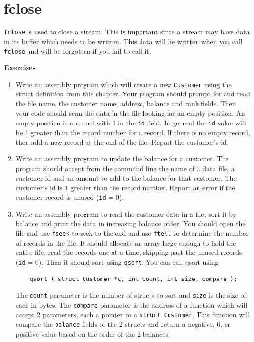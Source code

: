 \documentclass[11pt,b5paper]{book}
\begin{document}
\section{fclose}

{\tt fclose} is used to close a stream.
This is important since a stream may have data in its buffer which needs to be written.
This data will be written when you call {\tt fclose} and will be forgotten if you fail
to call it.

\vfill
\break
{\bf\large Exercises}

\begin{enumerate}
    \item Write an assembly program which will create a new {\tt Customer} using the struct definition from
    this chapter.
    Your program should prompt for and read the file name, the customer name, address, balance and rank fields.
    Then your code should scan the data in the file looking for an empty position.
    An empty position is a record with 0 in the {\tt id} field.
    In general the {\tt id} value will be 1 greater than the record number for a record.
    If there is no empty record, then add a new record at the end of the file.
    Report the customer's id.
    
    \item Write an assembly program to update the balance for a customer.
    The program should accept from the command line the name of a data file, a customer id and
    an amount to add to the balance for that customer.
    The customer's id is 1 greater than the record number.
    Report an error if the customer record is unused ({\tt id} = 0).
    
    \item Write an assembly program to read the customer data in a file, sort it by balance and print
    the data in increasing balance order.
    You should open the file and use {\tt fseek} to seek to the end and use {\tt ftell} to determine the
    number of records in the file.
    It should allocate an array large enough to hold the entire file, read the records one at a time,
    skipping past the unused records ({\tt id} = 0).
    Then it should sort using {\tt qsort}.
    You can call qsort using
    \begin{verbatim}
    qsort ( struct Customer *c, int count, int size, compare );
    \end{verbatim}
    The {\tt count} parameter is the number of structs to sort and {\tt size} is the size of each
    in bytes.
    The {\tt compare} parameter is the address of a function which will accept 2 parameters, each
    a pointer to a {\tt struct Customer}.
    This function will compare the {\tt balance} fields of the 2 structs and return a negative, 0,
    or positive value based on the order of the 2 balances.
    

\end{enumerate}
\end{document}
